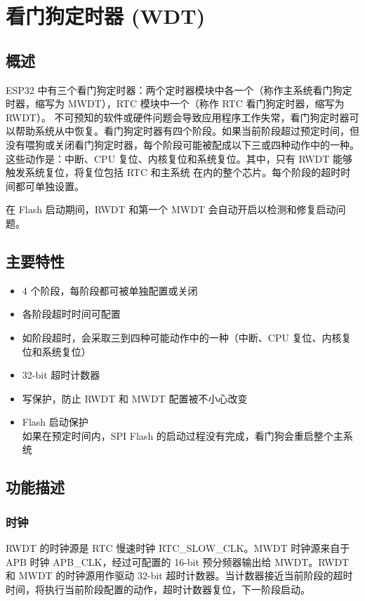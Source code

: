 \documentclass[main\_\_CN.tex]{subfiles}
\begin{document}
\setcounter{secnumdepth}{4}

\hypertarget{wdt}{}
\chapter{看门狗定时器 (WDT)}
\label{mod:wdt}

\section{概述}
ESP32 中有三个看门狗定时器：两个定时器模块中各一个（称作主系统看门狗定时器，缩写为 MWDT），RTC 模块中一个（称作 RTC 看门狗定时器，缩写为 RWDT）。
不可预知的软件或硬件问题会导致应用程序工作失常，看门狗定时器可以帮助系统从中恢复。看门狗定时器有四个阶段。如果当前阶段超过预定时间，但没有喂狗或关闭看门狗定时器，每个阶段可能被配成以下三或四种动作中的一种。这些动作是：中断、CPU 复位、内核复位和系统复位。其中，只有 RWDT 能够触发系统复位，将复位包括 RTC 和主系统 在内的整个芯片。每个阶段的超时时间都可单独设置。

在 Flash 启动期间，RWDT 和第一个 MWDT 会自动开启以检测和修复启动问题。

\section{主要特性}
\begin{itemize}
    \item 4 个阶段，每阶段都可被单独配置或关闭
    \item 各阶段超时时间可配置
    \item 如阶段超时，会采取三到四种可能动作中的一种（中断、CPU 复位、内核复位和系统复位）
    \item 32-bit 超时计数器
    \item 写保护，防止 RWDT 和 MWDT 配置被不小心改变
    \item Flash 启动保护\\
     如果在预定时间内，SPI Flash 的启动过程没有完成，看门狗会重启整个主系统
\end{itemize}

\section{功能描述}
\subsection{时钟}
RWDT 的时钟源是 RTC 慢速时钟 RTC\_SLOW\_CLK。MWDT 时钟源来自于 APB 时钟 APB\_CLK，经过可配置的 16-bit 预分频器输出给 MWDT。RWDT 和 MWDT 的时钟源用作驱动 32-bit 超时计数器。当计数器接近当前阶段的超时时间，将执行当前阶段配置的动作，超时计数器复位，下一阶段启动。
\end{document}

